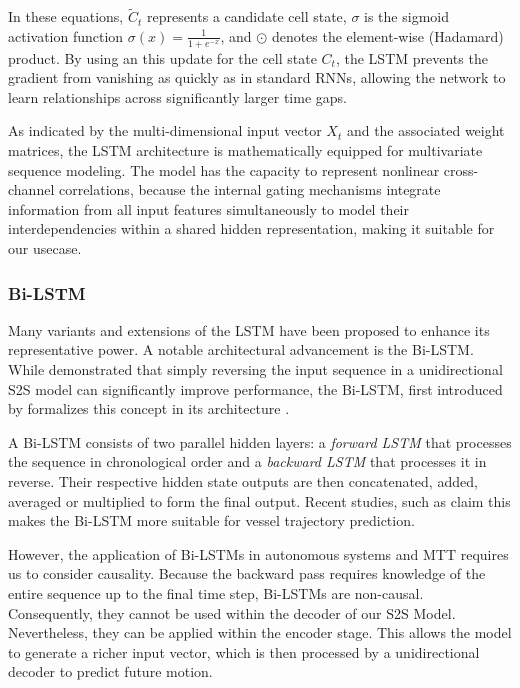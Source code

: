      In these equations, $\tilde{C}_t$ represents a candidate cell state, $\sigma$ is the sigmoid activation function $\sigma(x) = \frac{1}{1 + e^{-x}}$, and $\odot$ denotes the element-wise (Hadamard) product. By using an this update for the cell state $C_t$, the \ac{LSTM} prevents the gradient from vanishing as quickly as in standard \acp{RNN}, allowing the network to learn relationships across significantly larger time gaps.

     As indicated by the multi-dimensional input vector $X_t$ and the associated weight matrices, the \ac{LSTM} architecture is mathematically equipped for multivariate sequence modeling. The model has the capacity to represent nonlinear cross-channel correlations, because the internal gating mechanisms integrate information from all input features simultaneously to model their interdependencies within a shared hidden representation, making it suitable for our usecase. 
    

    \subsubsection{Bi-LSTM}
    Many variants and extensions of the \ac{LSTM} have been proposed to enhance its representative power. A notable architectural advancement is the \ac{Bi-LSTM}. While \cite{sutskever2014sequencesequencelearningneural} demonstrated that simply reversing the input sequence in a unidirectional \ac{S2S} model can significantly improve performance, the \ac{Bi-LSTM}, first introduced by \cite{articlebilstmorigins} formalizes this concept in its architecture .
    
    A \ac{Bi-LSTM} consists of two parallel hidden layers: a \textit{forward \ac{LSTM}} that processes the sequence in chronological order and a \textit{backward \ac{LSTM}} that processes it in reverse. Their respective hidden state outputs are then concatenated, added, averaged or multiplied  to form the final output. 
    Recent studies, such as \cite{articlebilstmsus} claim this makes the \ac{Bi-LSTM} more suitable for vessel trajectory prediction. 
   
    However, the application of \acp{Bi-LSTM} in autonomous systems and \ac{MTT} requires us to consider causality. Because the backward pass requires knowledge of the entire sequence up to the final time step, \acp{Bi-LSTM} are non-causal. Consequently, they cannot be used within the decoder of our \ac{S2S} Model. Nevertheless, they can be applied within the encoder stage. This allows the model to generate a richer input vector, which is then processed by a unidirectional decoder to predict future motion. %

